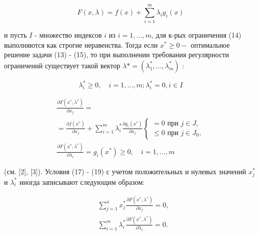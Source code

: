 \documentclass[10pt]{article}
\begin{document}
\[

F(x, \lambda)=f(x)+\sum_{i=1}^{m} \lambda_{i} g_{i}(x)

\]



и пусть $I$ - множество индексов $i$ из $i=1, \ldots, m$, для к-рых ограничения (14) выполняются как строгие неравенства. Тогда если $x^{*} \geqslant 0-$ оптимальное решение задачи (13) - (15), то при выполнении требования регулярности ограничений существует такой вектор $\lambda *=\left(\lambda_{1}^{*}, \ldots, \lambda_{m}^{*}\right)$ :



\[

\lambda_{i}^{*} \geqslant 0, \quad i=1, \ldots, m ; \lambda_{i}^{*}=0, i \in I

\]



\[

\begin{gathered}

\frac{\partial F\left(x^{*}, \lambda^{*}\right)}{\partial x_{j}}= \\

=\frac{\partial f\left(x^{*}\right)}{\partial x_{j}}+\sum_{i=1}^{m} \lambda_{i}^{*} \frac{\partial g_{i}\left(x^{*}\right)}{\partial x_{j}}\left\{\begin{array}{l}

=0 \text { при } j \in J, \\

\leqslant 0 \text { при } j \in J_{0},

\end{array}\right. \\

\frac{\partial F\left(x^{*}, \lambda^{*}\right)}{\partial \lambda_{i}}=g_{i}\left(x^{*}\right) \geqslant 0, \quad i=1, \ldots, m

\end{gathered}

\]



(см. [2], [3]). Условия (17) - (19) с учетом положительных и нулевых значений $x_{j}^{*}$ и $\lambda_{i}^{*}$ иногда записывают следующим образом:



\[

\begin{aligned}

& \sum_{j=1}^{n} x_{j}^{*} \frac{\partial F\left(x^{*}, \lambda^{*}\right)}{\partial x_{j}}=0, \\

& \sum_{i=1}^{m} \lambda_{i}^{*} \frac{\partial F\left(x^{*}, \lambda^{*}\right)}{\partial \lambda_{i}}=0 .

\end{aligned}

\]
\end{document}
